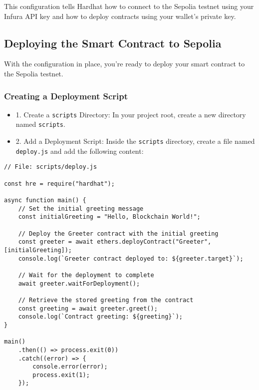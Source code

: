 \documentclass[12pt]{article}
\begin{document}
\noindent
This configuration tells Hardhat how to connect to the Sepolia testnet using your Infura API key and how to deploy contracts using your wallet's private key.

\subsection{Deploying the Smart Contract to Sepolia}

With the configuration in place, you're ready to deploy your smart contract to
the Sepolia testnet.

\subsubsection{Creating a Deployment Script}

\begin{itemize}
    \item 1. Create a \texttt{scripts} Directory: In your project root, create a new directory named \texttt{scripts}.

    \item 2. Add a Deployment Script: Inside the \texttt{scripts} directory, create a file named \texttt{deploy.js} and add the following content:
\end{itemize}

\noindent
\begin{minipage}[c]{\textwidth}
    \begin{verbatim}
// File: scripts/deploy.js

const hre = require("hardhat");

async function main() {
    // Set the initial greeting message
    const initialGreeting = "Hello, Blockchain World!";
    
    // Deploy the Greeter contract with the initial greeting
    const greeter = await ethers.deployContract("Greeter", [initialGreeting]);
    console.log(`Greeter contract deployed to: ${greeter.target}`);

    // Wait for the deployment to complete
    await greeter.waitForDeployment();

    // Retrieve the stored greeting from the contract
    const greeting = await greeter.greet();
    console.log(`Contract greeting: ${greeting}`);
}

main()
    .then(() => process.exit(0))
    .catch((error) => {
        console.error(error);
        process.exit(1);
    });
\end{verbatim}
\end{minipage}
\end{document}
